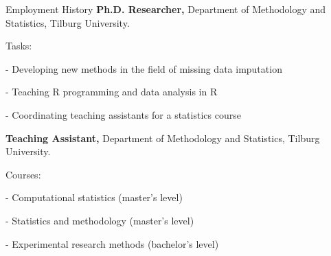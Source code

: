 %
%
\begin{rubric}{Employment History}
%
	\textbf{Ph.D. Researcher,} Department of Methodology and Statistics, Tilburg University.

	Tasks:

	- Developing new methods in the field of missing data imputation

	- Teaching R programming and data analysis in R

	- Coordinating teaching assistants for a statistics course
	
\entry*[2018 -- 2019]%
	\textbf{Teaching Assistant,} Department of Methodology and Statistics, Tilburg University. 
		
	Courses:

	- Computational statistics (master's level)

	- Statistics and methodology (master's level)

	- Experimental research methods (bachelor's level)
%
\end{rubric}